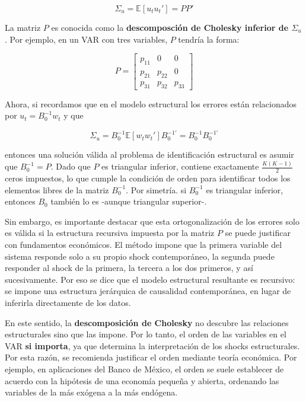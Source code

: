 \documentclass[
]{book}
\begin{document}
\begin{equation}
\Sigma_u = \mathbb{E}[u_t u_t'] = P P'
\end{equation}

La matriz \(P\) es conocida como la \textbf{descomposción de Cholesky inferior de \(\Sigma_u\)}. Por ejemplo, en un VAR con tres variables, \(P\) tendría la forma:

\[
P = 
\begin{bmatrix}
p_{11} & 0      & 0 \\
p_{21} & p_{22} & 0 \\
p_{31} & p_{32} & p_{33}
\end{bmatrix}
\]

Ahora, si recordamos que en el modelo estructural los errores están relacionados por \(u_t = B_0^{-1}w_t\) y que

\begin{equation}
\Sigma_u = B_0^{-1} \mathbb{E}[w_t w_t'] B_0^{-1'} = B_0^{-1} B_0^{-1'}
\end{equation}

entonces una solución válida al problema de identificación estructural es asumir que \(B_0^{-1} = P\). Dado que \(P\) es triangular inferior, contiene exactamente \(\frac{K(K-1)}{2}\) ceros impuestos, lo que cumple la condición de orden para identificar todos los elementos libres de la matriz \(B_0^{-1}\). Por simetría. si \(B_0^{-1}\) es triangular inferior, entonces \(B_0\) también lo es -aunque triangular superior-.

Sin embargo, es importante destacar que esta ortogonalización de los errores solo es válida si la estructura recursiva impuesta por la matriz \(P\) se puede justificar con fundamentos económicos. El método impone que la primera variable del sistema responde solo a su propio shock contemporáneo, la segunda puede responder al shock de la primera, la tercera a los dos primeros, y así sucesivamente. Por eso se dice que el modelo estructural resultante es recursivo: se impone una estructura jerárquica de causalidad contemporánea, en lugar de inferirla directamente de los datos.

En este sentido, la \textbf{descomposición de Cholesky} no descubre las relaciones estructurales sino que las impone. Por lo tanto, el orden de las variables en el VAR \textbf{si importa}, ya que determina la interpretación de los shocks estructurales. Por esta razón, se recomienda justificar el orden mediante teoría económica. Por ejemplo, en aplicaciones del Banco de México, el orden se suele establecer de acuerdo con la hipótesis de una economía pequeña y abierta, ordenando las variables de la más exógena a la más endógena.
\end{document}
